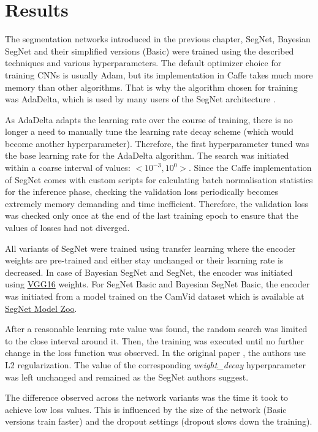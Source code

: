\chapter{Results}

The segmentation networks introduced in the previous chapter, SegNet, Bayesian SegNet and their simplified versions (Basic) were trained using the described techniques and various hyperparameters. The default optimizer choice for training CNNs is usually Adam, but its implementation in Caffe takes much more memory than other algorithms. That is why the algorithm chosen for training was AdaDelta, which is used by many users of the SegNet architecture \cite{aizawan_github}.

As AdaDelta adapts the learning rate over the course of training, there is no longer a need to manually tune the learning rate decay scheme (which would become another hyperparameter). Therefore, the first hyperparameter tuned was the base learning rate for the AdaDelta algorithm. The search was initiated within a coarse interval of values: $ <10^{-3}, 10^{0}>  $. Since the Caffe implementation of SegNet comes with custom scripts for calculating batch normalisation statistics for the inference phase, checking the validation loss periodically becomes extremely memory demanding and time inefficient. Therefore, the validation loss was checked only once at the end of the last training epoch to ensure that the values of losses had not diverged.  

All variants of SegNet were trained using transfer learning where the encoder weights are pre-trained and either stay unchanged or their learning rate is decreased. In case of Bayesian SegNet and SegNet, the encoder was initiated using \href{http://www.robots.ox.ac.uk/~vgg/research/very_deep/}{VGG16} weights. For SegNet Basic and Bayesian SegNet Basic, the encoder was initiated from a model trained on the CamVid dataset which is available at \href{https://github.com/alexgkendall/SegNet-Tutorial/blob/master/Example_Models/segnet_model_zoo.md}{SegNet Model Zoo}. 

After a reasonable learning rate value was found, the random search was limited to the close interval around it. Then, the training was executed until no further change in the loss function was observed. In the original paper \cite{segnet}, the authors use L2 regularization. The value of the corresponding \textit{weight\_decay} hyperparameter was left unchanged and remained as the SegNet authors suggest.  

The difference observed across the network variants was the time it took to achieve low loss values. This is influenced by the size of the network (Basic versions train faster) and the dropout settings (dropout slows down the training).

